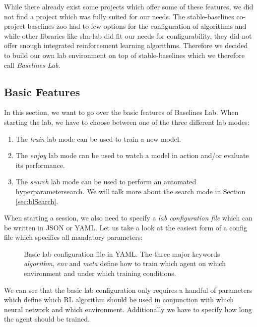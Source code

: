 While there already exist some projects which offer some of these features, we did not find a project which was fully suited for our needs. The stable-baselines co-project baselines zoo \cite{rl-zoo} had to few options for the configuration of algorithms and while other libraries like slm-lab \cite{kenggraesser2017slmlab} did fit our needs for configurability, they did not offer enough integrated reinforcement learning algorithms. Therefore we decided to build our own lab environment on top of stable-baselines which we therefore call \textit{Baselines Lab}.

\subsection{Basic Features} \label{sec:blFunctions}
In this section, we want to go over the basic features of Baselines Lab. When starting the lab, we have to choose between one of the three different lab modes:

\begin{enumerate}
    \item The \textit{train} lab mode can be used to train a new model.
    \item The \textit{enjoy} lab mode can be used to watch a model in action and/or evaluate its performance.
    \item The \textit{search} lab mode can be used to perform an automated hyperparametersearch. We will talk more about the search mode in Section \ref{sec:blSearch}.
\end{enumerate}

When starting a session, we also need to specify a \textit{lab configuration file} which can be written in JSON or YAML. Let us take a look at the easiest form of a config file which specifies all mandatory parameters:

\begin{figure}[h]
    
    \caption[Basic lab configuration file]{Basic lab configuration file in YAML. The three major keywords \textit{algorithm}, \textit{env} and \textit{meta} define how to train which agent on which environment and under which training conditions.}
    \label{fig:BasicLabConfig}
\end{figure}


We can see that the basic lab configuration only requires a handful of parameters which define which RL algorithm should be used in conjunction with which neural network and which environment. Additionally we have to specify how long the agent should be trained. 

